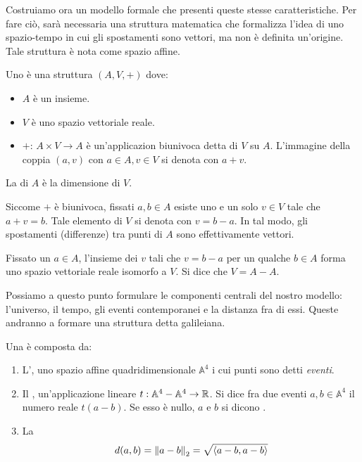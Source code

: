 Costruiamo ora un modello formale che presenti queste stesse caratteristiche. Per fare ciò, sarà necessaria una struttura matematica che formalizza l'idea di uno spazio-tempo in cui gli spostamenti sono vettori, ma non è definita un'origine. Tale struttura è nota come spazio affine.
\begin{definition}
  Uno  è una struttura $(A,V,+)$ dove:
  \begin{itemize}
    \item $A$ è un insieme.
    \item $V$ è uno spazio vettoriale reale.
    \item $+:\, A\times V \to A$ è un'applicazion biunivoca detta  di $V$ su $A$. L'immagine della coppia $(a,v)$ con $a \in  A, v \in V$ si denota con $a+v$.
  \end{itemize}
  La  di $A$ è la dimensione di $V$.
\end{definition}
\begin{remark}
  Siccome $+$ è biunivoca, fissati $a,b \in A$ esiste uno e un solo $v \in V$ tale che $a + v = b$. Tale elemento di $V$ si denota con $v = b - a$. In tal modo, gli spostamenti (differenze) tra punti di $A$ sono effettivamente vettori.
\end{remark}
\begin{remark}
Fissato un $a \in A$, l'insieme dei $v$ tali che $v = b - a$ per un qualche $b \in A$ forma uno spazio vettoriale reale isomorfo a $V$. Si dice che $V = A - A$.
\end{remark}

Possiamo a questo punto formulare le componenti centrali del nostro modello: l'universo, il tempo, gli eventi contemporanei e la distanza fra di essi. Queste andranno a formare una struttura detta galileiana.
\begin{definition}
  Una  è composta da:
  \begin{enumerate}
    \item L', uno spazio affine quadridimensionale $\mathbb{A}^4$ i cui punti sono detti \emph{eventi}.
    \item Il , un'applicazione lineare $t:\mathbb{A}^4 - \mathbb{A}^4 \to \mathbb{R}$. Si dice  fra due eventi $a,b \in \mathbb{A}^4$ il numero reale $t(a-b)$. Se esso è nullo, $a$ e $b$ si dicono .
    \item La  \begin{equation}
    d(a,b) = \norm{a-b}_2 = \sqrt{\ev{a-b,a-b}}  
    \end{equation} 
  \end{enumerate}
\end{definition}

